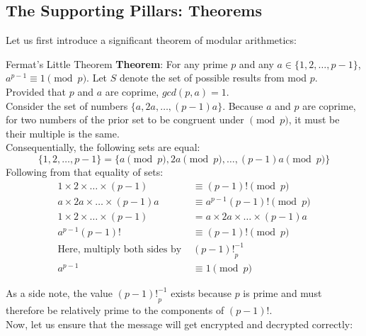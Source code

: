 \subsection{The Supporting Pillars: Theorems}
Let us first introduce a significant theorem of modular arithmetics:
\begin{ln-theorem}{Fermat's Little Theorem}{}
    \textbf{Theorem}: For any prime $p$ and any $a \in \{1, 2, \dots, p - 1\}$, $a^{p - 1} \equiv 1\pmod{p}$.
    \tcblower
    Let $S$ denote the set of possible results from mod $p$. \\
    Provided that $p$ and $a$ are coprime, $gcd(p,a) = 1$. \\
    Consider the set of numbers $\{a, 2a, \dots, (p - 1)a\}$. Because $a$ and $p$ are coprime, for two numbers of the prior set to be congruent under $\pmod{p}$, it must be their multiple is the same. \\
    Consequentially, the following sets are equal:
    \[
        \{1, 2, \dots, p - 1\} = \{a\pmod{p}, 2a\pmod{p}, \dots, (p-1)a\pmod{p}\}
    \]
    Following from that equality of sets:
    \begin{align*}
        1 \times 2 \times \dots \times (p - 1) &\equiv (p - 1)!\pmod{p} \\
        a \times 2a \times \dots \times (p - 1)a &\equiv a^{p - 1}(p - 1)!\pmod{p} \\
        1 \times 2 \times \dots \times (p - 1) &= a \times 2a \times \dots \times (p - 1)a \\
        a^{p - 1}(p - 1)! &\equiv (p - 1)!\pmod{p} \\
        \text{Here, multiply both sides by } &{(p - 1)!}_{p}^{-1} \\
        a^{p - 1} &\equiv 1\pmod{p}
    \end{align*}
\end{ln-theorem}
As a side note, the value ${(p - 1)!}_{p}^{-1}$ exists because $p$ is prime and must therefore be relatively prime to the components of $(p - 1)!$. \\
Now, let us ensure that the message will get encrypted and decrypted correctly:
